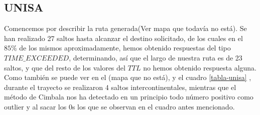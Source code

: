\subsection{UNISA}


Comencemos por describir la ruta generada(Ver mapa que todavía no está). Se han realizado 27 saltos hasta alcanzar el destino solicitado, de los cuales en el $85 \% $ de los mismos aproximadamente, hemos obtenido respuestas del tipo $TIME\_EXCEEDED$, determinando, así que el largo de nuestra ruta es de 23 saltos, y que del resto de los valores del $TTL$ no hemos obtenido respuesta alguna. Como también se puede ver en el (mapa que no está), y el cuadro \ref{tabla-unisa} , durante el trayecto se realizaron 4 saltos intercontinentales, mientras que el método de Cimbala nos ha detectado en un principio todo número positivo como outlier y al sacar los 0s los que se observan en el cuadro antes mencionado.

